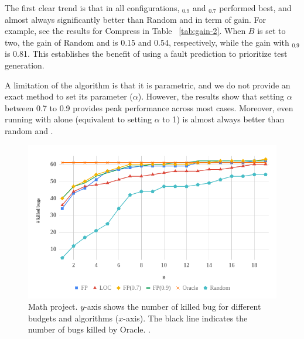 \begin{}
The first clear trend is that in all configurations, \fp$_{0.9}$ and \fp$_{0.7}$ performed best, and almost always significantly better than Random and \loc in term of gain. For example, see  the results for Compress in Table ~\ref{tab:gain-2}. When $B$ is set to two, the gain of Random and \loc is 0.15 and 0.54, respectively, while the gain with \fp$_{0.9}$ is 0.81. This establishes the benefit of using a fault prediction to prioritize test generation. 

















A limitation of the \mix algorithm is that it is parametric, and we do not
provide an exact method to set its parameter ($\alpha$). However, the results
show that setting $\alpha$ between 0.7 to 0.9 provides peak performance across
most cases. Moreover, even running with \fp alone (equivalent to setting
$\alpha$ to 1) is almost always better than random and \loc.



\begin{figure}
    \centering
    \includegraphics[width=1\columnwidth]{Charts/MATH_chart.png}
    \caption{Math project. $y$-axis shows the number of killed bug for different budgets and \btg algorithms ($x$-axis). The black line indicates the number of bugs killed by Oracle. .}
    \label{fig:math}
\end{figure}



\end{}
